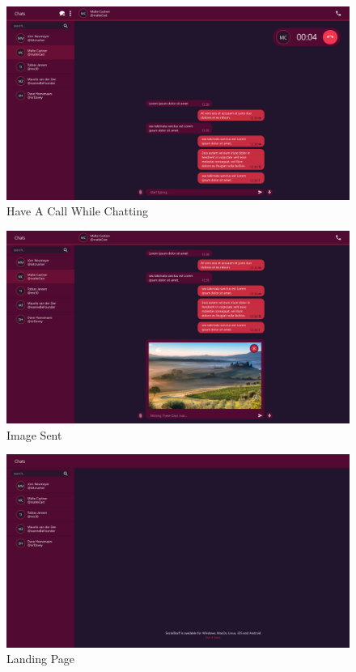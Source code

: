 \begin{figure}[h]
    \centering
    \includegraphics[width=1.0\textwidth]{./graphics/wireframes/HaveACallWhileChating}
    \caption{Have A Call While Chatting}
    \label{fig:figure20}
\end{figure}

\begin{figure}[h]
    \centering
    \includegraphics[width=1.0\textwidth]{./graphics/wireframes/ImageSent}
    \caption{Image Sent}
    \label{fig:figure21}
\end{figure}

\begin{figure}[h]
    \centering
    \includegraphics[width=1.0\textwidth]{./graphics/wireframes/LandingPage}
    \caption{Landing Page}
    \label{fig:figure22}
\end{figure}


